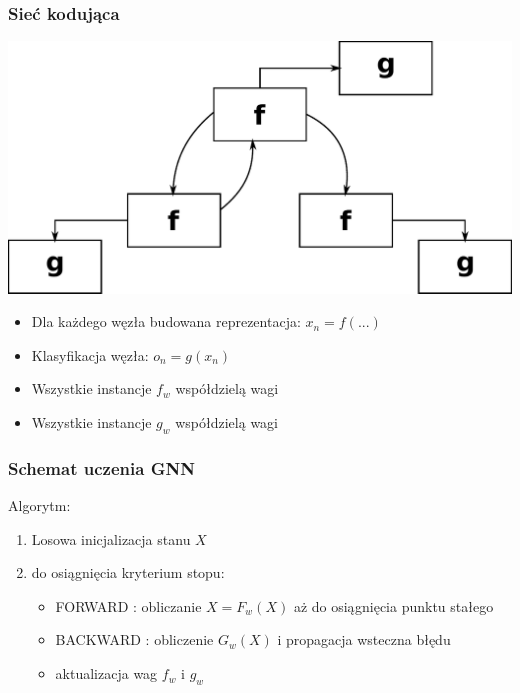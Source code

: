 \documentclass{beamer}
\begin{document}
\begin{frame}
\frametitle{Sieć kodująca}
\begin{center}
	\includegraphics[scale=0.5]{img/encoding}
\end{center}
\begin{itemize}
	\item Dla każdego węzła budowana reprezentacja: $x_n = f(...)$
	\item Klasyfikacja węzła: $o_n = g(x_n)$
	\item Wszystkie instancje $f_w$ współdzielą wagi
	\item Wszystkie instancje $g_w$ współdzielą wagi
\end{itemize}
\end{frame}

\begin{frame}
\frametitle{Schemat uczenia GNN}
Algorytm:
\begin{enumerate}
	\item Losowa inicjalizacja stanu $X$
	\item do osiągnięcia kryterium stopu:
	\begin{itemize}
		\item FORWARD : obliczanie $X = F_w(X)$ aż do osiągnięcia punktu stałego
		\item BACKWARD : obliczenie $G_w(X)$ i propagacja wsteczna błędu
		\item aktualizacja wag $f_w$ i $g_w$
	\end{itemize}
\end{enumerate}
\end{frame}
\end{document}
